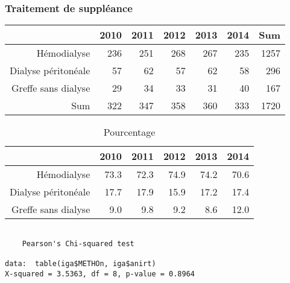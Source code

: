 \documentclass[11pt,a4paper]{article}\usepackage[]{graphicx}\usepackage[]{color}
\makeatletter
\newenvironment{kframe}{%
 \def\at@end@of@kframe{}%
 \ifinner\ifhmode%
  \def\at@end@of@kframe{\end{minipage}}%
  \begin{minipage}{\columnwidth}%
 \fi\fi%
 \def\FrameCommand##1{\hskip\@totalleftmargin \hskip-\fboxsep
 \colorbox{shadecolor}{##1}\hskip-\fboxsep
     \hskip-\linewidth \hskip-\@totalleftmargin \hskip\columnwidth}%
 \MakeFramed {\advance\hsize-\width
   \@totalleftmargin\z@ \linewidth\hsize
   \@setminipage}}%
 {\par\unskip\endMakeFramed%
 \at@end@of@kframe}
\newenvironment{knitrout}{}{} %
\makeatother
\begin{document}
    \subsubsection{Traitement de suppléance}

\begin{table}[ht]
\centering
\begin{tabular}{rrrrrrr}
  \hline
 & 2010 & 2011 & 2012 & 2013 & 2014 & Sum \\ 
  \hline
Hémodialyse & 236 & 251 & 268 & 267 & 235 & 1257 \\ 
  Dialyse péritonéale & 57 & 62 & 57 & 62 & 58 & 296 \\ 
  Greffe sans dialyse & 29 & 34 & 33 & 31 & 40 & 167 \\ 
  Sum & 322 & 347 & 358 & 360 & 333 & 1720 \\ 
   \hline
\end{tabular}
\end{table}
\begin{table}[ht]
\centering
\begin{tabular}{rrrrrr}
  \hline
 & 2010 & 2011 & 2012 & 2013 & 2014 \\ 
  \hline
Hémodialyse & 73.3 & 72.3 & 74.9 & 74.2 & 70.6 \\ 
  Dialyse péritonéale & 17.7 & 17.9 & 15.9 & 17.2 & 17.4 \\ 
  Greffe sans dialyse & 9.0 & 9.8 & 9.2 & 8.6 & 12.0 \\ 
   \hline
\end{tabular}
\caption{Pourcentage} 
\end{table}


\begin{knitrout}
\color{fgcolor}\begin{kframe}
\begin{verbatim}

	Pearson's Chi-squared test

data:  table(iga$METHOn, iga$anirt)
X-squared = 3.5363, df = 8, p-value = 0.8964
\end{verbatim}
\end{kframe}
\end{knitrout}
\end{document}
